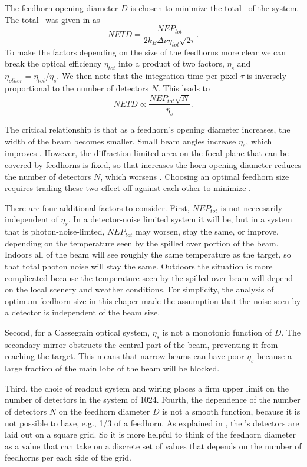The feedhorn opening diameter $D$ is chosen to minimize the total \NETD\ of the system.
The total \NETD\ was given in  as
\begin{equation}
    NETD = \frac{NEP_{tot}}{2 k_B \Delta \nu \eta_{tot} \sqrt{2 \tau}}.
\end{equation}
To make the factors depending on the size of the feedhorns more clear we can break the optical efficiency $\eta_{tot}$ into a product of two factors, $\eta_s$ and $\eta_{other} = \eta_{tot} / \eta_s$.
We then note that the integration time per pixel $\tau$ is inversely proportional to the number of detectors $N$.
This leads to
\begin{equation}
    NETD \propto \frac{NEP_{tot}\sqrt{N}}{\eta_s}.
\end{equation}

The critical relationship is that as a feedhorn's opening diameter increases, the width of the beam becomes smaller.
Small beam angles increase $\eta_s$, which improves \NETD.
However, the diffraction-limited area on the focal plane that can be covered by feedhorns is fixed, so that increases the horn opening diameter reduces the number of detectors $N$, which worsens \NETD.
Choosing an optimal feedhorn size requires trading these two effect off against each other to minimize \NETD.

There are four additional factors to consider.
First, $NEP_{tot}$ is not neccesarily independent of $\eta_s$.
In a detector-noise limited system it will be, but in a system that is photon-noise-limted, $NEP_{tot}$ may worsen, stay the same, or improve, depending on the temperature seen by the spilled over portion of the beam.
Indoors all of the beam will see roughly the same temperature as the target, so that total photon noise will stay the same.
Outdoors the situation is more complicated because the temperature seen by the spilled over beam will depend on the local scenery and weather conditions.
For simplicity, the analysis of optimum feedhorn size in this chaper made the assumption that the noise seen by a detector is independent of the beam size.

Second, for a Cassegrain optical system, $\eta_s$ is not a monotonic function of $D$.
The secondary mirror obstructs the central part of the beam, preventing it from reaching the target.
This means that narrow beams can have poor $\eta_s$ because a large fraction of the main lobe of the beam will be blocked.

Third, the choie of readout system and wiring places a firm upper limit on the number of detectors in the system of 1024.
Fourth, the dependence of the number of detectors $N$ on the feedhorn diameter $D$ is not a smooth function, because it is not possible to have, e.g., 1/3 of a feedhorn.
As explained in , the \Imager's detectors are laid out on a square grid.
So it is more helpful to think of the feedhorn diameter as a value that can take on a discrete set of values that depends on the number of feedhorns per each side of the grid.

